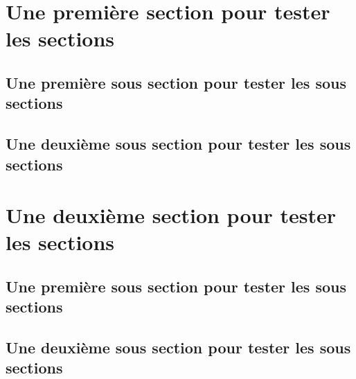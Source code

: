 \documentclass{esithesis}
\begin{document}
\section{Une première section pour tester les sections}

\lipsum[1-1]

\subsection{Une première sous section pour tester les sous sections}

\lipsum[1-6]

\subsection{Une deuxième sous section pour tester les sous sections}

\lipsum[1-6]

\section{Une deuxième section pour tester les sections}

\lipsum[1-1]

\subsection{Une première sous section pour tester les sous sections}

\lipsum[1-6]

\subsection{Une deuxième sous section pour tester les sous sections}

\lipsum[1-6]
\end{document}

